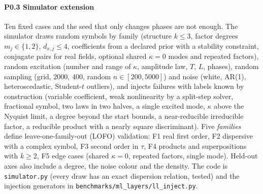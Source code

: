 \paragraph{P0.3 Simulator extension} Ten fixed cases and the seed that only changes phases are not enough. The simulator draws random symbols by family (structure $k\le3$, factor degrees $m_j\in\{1,2\}$, $d_{x,j}\le4$, coefficients from a declared prior with a stability constraint, conjugate pairs for real fields, optional shared $\kappa=0$ modes and repeated factors),
random excitation (number and range of $\kappa$, amplitude law, $T$, $L$, phases), random sampling (grid, $2000$, $400$, random $n\in[200,5000]$) and noise (white, AR(1), heteroscedastic, Student-$t$ outliers), and injects failures with labels known by construction (variable coefficient, weak nonlinearity by a split-step solver, fractional symbol, two laws in two halves, a single excited mode,
$\kappa$ above the Nyquist limit, a degree beyond the start bounds, a near-reducible irreducible factor, a reducible product with a nearly square discriminant). Five \emph{families} define leave-one-family-out (LOFO) validation:
F1 real first order, F2 dispersive with a complex symbol, F3 second order in $\tau$, F4 products and superpositions with $k\ge2$, F5 edge cases (shared $\kappa=0$, repeated factors, single mode). Held-out axes also include a degree, the noise colour and the density.
The code is \texttt{simulator.py} (every draw has an exact dispersion relation, tested) and the injection generators in \texttt{benchmarks/ml\_layers/ll\_inject.py}.
